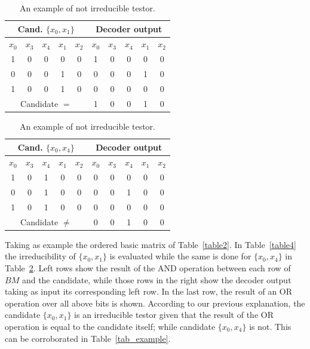 \documentclass[authoryear,preprint,review,12pt]{elsarticle}
\begin{document}
\setlength{\tabcolsep}{3pt}
\begin{table}[!htb]
    \begin{minipage}{.5\linewidth}
      \caption{An example of irreducible testor.}\label{table4}
      \centering
        \begin{tabular}{ ccccc|ccccc }
 			\hline                       
  			\multicolumn{5}{c|}{Cand. $\{x_0, x_1\}$} & 
  			\multicolumn{5}{c}{Decoder output} \\
  			\hline
			  $x_0$ &   $x_3$ &   $x_4$ &   $x_1$ &   $x_2$ &
  			  $x_0$ &   $x_3$ &   $x_4$ &   $x_1$ &   $x_2$ \\
  			\hline
  			1 & 0 & 0 & 0 & 0 & 1 & 0 & 0 & 0 & 0\\
  			0 & 0 & 0 & 1 & 0 & 0 & 0 & 0 & 1 & 0\\
  			1 & 0 & 0 & 1 & 0 & 0 & 0 & 0 & 0 & 0\\
  			\hline  
  			\multicolumn{5}{c|}{Candidate $=$} & 1 & 0 & 0 & 1 & 0\\
  			\hline  
		\end{tabular}
    \end{minipage}%
    \begin{minipage}{.5\linewidth}
      \centering
        \caption{An example of not irreducible testor.}\label{table5}
        \begin{tabular}{ ccccc|ccccc }
 			\hline                       
  			\multicolumn{5}{c|}{Cand. $\{x_0, x_4\}$} & 
  			\multicolumn{5}{c}{Decoder output} \\
  			\hline
  			  $x_0$ &   $x_3$ &   $x_4$ &   $x_1$ &   $x_2$ &
  			  $x_0$ &   $x_3$ &   $x_4$ &   $x_1$ &   $x_2$ \\
  			\hline
  			1 & 0 & 1 & 0 & 0 & 0 & 0 & 0 & 0 & 0\\
  			0 & 0 & 1 & 0 & 0 & 0 & 0 & 1 & 0 & 0\\
  			1 & 0 & 1 & 0 & 0 & 0 & 0 & 0 & 0 & 0\\
  			\hline  
  			\multicolumn{5}{c|}{Candidate $\neq$} & 0 & 0 & 1 & 0 & 0\\
  			\hline  
		\end{tabular}
    \end{minipage} 
\end{table}

Taking as example the ordered basic matrix of Table~\ref{table2}. In Table~\ref{table4} the irreducibility of  $\{x_0,x_1\}$ is evaluated while the same is done for $\{x_0,x_4\}$ in Table~\ref{table5}. Left rows show the result of the AND operation between each row of $BM$ and the candidate, while those rows in the right show the decoder output taking as input its corresponding left row. In the last row, the result of an OR operation over all above bits is shown. According to our previous explanation, the candidate $\{x_0,x_1\}$ is an irreducible testor given that the result of the OR operation is equal to the candidate itself; while candidate $\{x_0,x_4\}$ is not. This can be corroborated in Table~\ref{tab_example}.
\end{document}
